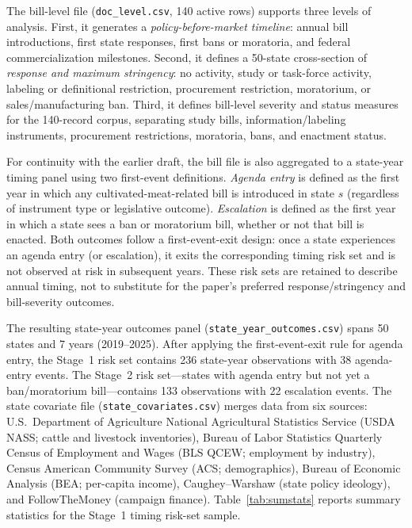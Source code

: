 \documentclass[12pt]{article}
\begin{document}
The bill-level file (\texttt{doc\_level.csv}, 140 active rows) supports three levels of analysis.  First, it generates a \emph{policy-before-market timeline}: annual bill introductions, first state responses, first bans or moratoria, and federal commercialization milestones.  Second, it defines a 50-state cross-section of \emph{response and maximum stringency}: no activity, study or task-force activity, labeling or definitional restriction, procurement restriction, moratorium, or sales/manufacturing ban.  Third, it defines bill-level severity and status measures for the 140-record corpus, separating study bills, information/labeling instruments, procurement restrictions, moratoria, bans, and enactment status.

For continuity with the earlier draft, the bill file is also aggregated to a state-year timing panel using two first-event definitions.  \emph{Agenda entry} is defined as the first year in which any cultivated-meat-related bill is introduced in state $s$ (regardless of instrument type or legislative outcome).  \emph{Escalation} is defined as the first year in which a state sees a ban or moratorium bill, whether or not that bill is enacted.  Both outcomes follow a first-event-exit design: once a state experiences an agenda entry (or escalation), it exits the corresponding timing risk set and is not observed at risk in subsequent years.  These risk sets are retained to describe annual timing, not to substitute for the paper's preferred response/stringency and bill-severity outcomes.

The resulting state-year outcomes panel (\texttt{state\_year\_outcomes.csv}) spans 50 states and 7 years (2019--2025).  After applying the first-event-exit rule for agenda entry, the Stage~1 risk set contains 236 state-year observations with 38 agenda-entry events.  The Stage~2 risk set---states with agenda entry but not yet a ban/moratorium bill---contains 133 observations with 22 escalation events.  The state covariate file (\texttt{state\_covariates.csv}) merges data from six sources: U.S.\ Department of Agriculture National Agricultural Statistics Service (USDA NASS; cattle and livestock inventories), Bureau of Labor Statistics Quarterly Census of Employment and Wages (BLS QCEW; employment by industry), Census American Community Survey (ACS; demographics), Bureau of Economic Analysis (BEA; per-capita income), Caughey--Warshaw (state policy ideology), and FollowTheMoney (campaign finance).  Table~\ref{tab:sumstats} reports summary statistics for the Stage~1 timing risk-set sample.
\end{document}
